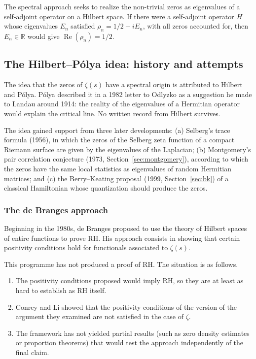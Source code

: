 \documentclass[11pt]{amsart}
\theoremstyle{definition}
\theoremstyle{remark}
\begin{document}
The spectral approach seeks to realize the non-trivial zeros as eigenvalues of a self-adjoint operator on a Hilbert space. If there were a self-adjoint operator $H$ whose eigenvalues $E_n$ satisfied $\rho_n = 1/2 + iE_n$, with all zeros accounted for, then $E_n \in \mathbb{R}$ would give $\operatorname{Re}(\rho_n) = 1/2$.

\subsection{The Hilbert--P\'olya idea: history and attempts}\label{sec:hp}

The idea that the zeros of $\zeta(s)$ have a spectral origin is attributed to Hilbert and P\'olya. P\'olya described it in a 1982 letter to Odlyzko as a suggestion he made to Landau around 1914: the reality of the eigenvalues of a Hermitian operator would explain the critical line. No written record from Hilbert survives.

The idea gained support from three later developments: (a) Selberg's trace formula (1956), in which the zeros of the Selberg zeta function of a compact Riemann surface are given by the eigenvalues of the Laplacian; (b) Montgomery's pair correlation conjecture (1973, Section~\ref{sec:montgomery}), according to which the zeros have the same local statistics as eigenvalues of random Hermitian matrices; and (c) the Berry--Keating proposal (1999, Section~\ref{sec:bk}) of a classical Hamiltonian whose quantization should produce the zeros.

\subsubsection{The de Branges approach}

Beginning in the 1980s, de Branges proposed to use the theory of Hilbert spaces of entire functions to prove RH. His approach consists in showing that certain positivity conditions hold for functionals associated to $\zeta(s)$.

This programme has not produced a proof of RH. The situation is as follows.
\begin{enumerate}[label=(\roman*)]
\item The positivity conditions proposed would imply RH, so they are at least as hard to establish as RH itself.
\item Conrey and Li \cite{conreyli2000} showed that the positivity conditions of the version of the argument they examined are not satisfied in the case of $\zeta$.
\item The framework has not yielded partial results (such as zero density estimates or proportion theorems) that would test the approach independently of the final claim.
\end{enumerate}
\end{document}
